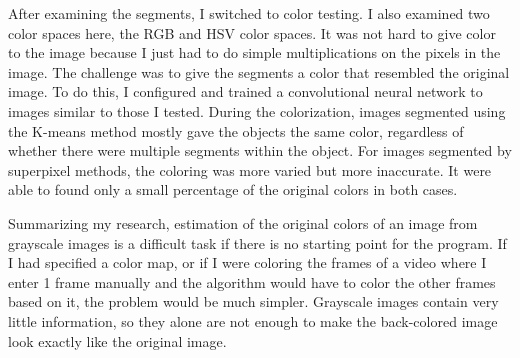 After examining the segments, I switched to color testing. I also examined two color spaces here, the RGB and HSV color spaces. It was not hard to give color to the image because I just had to do simple multiplications on the pixels in the image. The challenge was to give the segments a color that resembled the original image. To do this, I configured and trained a convolutional neural network to images similar to those I tested. During the colorization, images segmented using the K-means method mostly gave the objects the same color, regardless of whether there were multiple segments within the object. For images segmented by superpixel methods, the coloring was more varied but more inaccurate. It were able to found only a small percentage of the original colors in both cases.

Summarizing my research, estimation of the original colors of an image from grayscale images is a difficult task if there is no starting point for the program. If I had specified a color map, or if I were coloring the frames of a video where I enter 1 frame manually and the algorithm would have to color the other frames based on it, the problem would be much simpler. Grayscale images contain very little information, so they alone are not enough to make the back-colored image look exactly like the original image.
